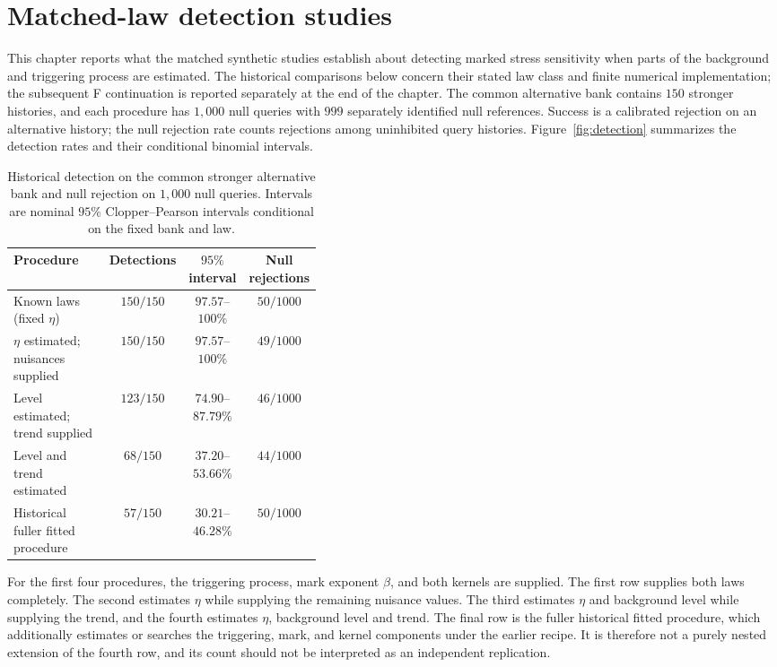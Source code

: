 \chapter{Matched-law detection studies}
\label{ch:synthetic}

This chapter reports what the matched synthetic studies establish about detecting marked stress sensitivity when parts of the background and triggering process are estimated. The historical comparisons below concern their stated law class and finite numerical implementation; the subsequent F continuation is reported separately at the end of the chapter. The common alternative bank contains \(150\) stronger histories, and each procedure has \(1{,}000\) null queries with \(999\) separately identified null references. Success is a calibrated rejection on an alternative history; the null rejection rate counts rejections among uninhibited query histories. Figure~\ref{fig:detection} summarizes the detection rates and their conditional binomial intervals.

\begin{table}[tbp]
\centering
\caption{Historical detection on the common stronger alternative bank and null rejection on \(1{,}000\) null queries. Intervals are nominal \(95\%\) Clopper--Pearson intervals conditional on the fixed bank and law.}
\label{tab:main-detection}
\small
\setlength{\tabcolsep}{4pt}
\begin{tabular}{@{}p{0.40\linewidth}ccc@{}}
\toprule
Procedure & Detections & \(95\%\) interval & Null rejections \\
\midrule
Known laws (fixed \(\eta\)) & \(150/150\) & \(97.57\)--\(100\%\) & \(50/1000\) \\
\(\eta\) estimated; nuisances supplied & \(150/150\) & \(97.57\)--\(100\%\) & \(49/1000\) \\
Level estimated; trend supplied & \(123/150\) & \(74.90\)--\(87.79\%\) & \(46/1000\) \\
Level and trend estimated & \(68/150\) & \(37.20\)--\(53.66\%\) & \(44/1000\) \\
Historical fuller fitted procedure & \(57/150\) & \(30.21\)--\(46.28\%\) & \(50/1000\) \\
\bottomrule
\end{tabular}
\end{table}

For the first four procedures, the triggering process, mark exponent \(\beta\), and both kernels are supplied. The first row supplies both laws completely. The second estimates \(\eta\) while supplying the remaining nuisance values. The third estimates \(\eta\) and background level while supplying the trend, and the fourth estimates \(\eta\), background level and trend. The final row is the fuller historical fitted procedure, which additionally estimates or searches the triggering, mark, and kernel components under the earlier recipe. It is therefore not a purely nested extension of the fourth row, and its count should not be interpreted as an independent replication.

